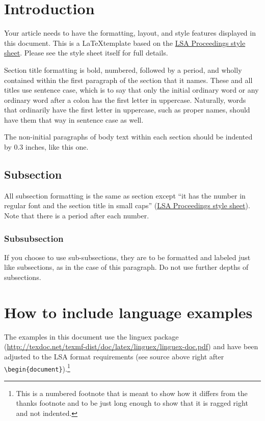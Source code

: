 \documentclass[12pt,letterpaper]{article}
\begin{document}
\section{Introduction} %
Your article needs to have the formatting, layout, and style features displayed in this document. This is a \LaTeX template based on the \href{https://drive.google.com/file/d/1r1YkBGcX7b7obNe0hLDrbJSSUTfNrFo1/view?usp=sharing}{LSA Proceedings style sheet}. Please see the style sheet itself for full details. 

Section title formatting is bold, numbered, followed by a period, and wholly contained within the first paragraph of the section that it names. These and all titles use sentence case, which is to say that only the initial ordinary word or any ordinary word after a colon has the first letter in uppercase. Naturally, words that ordinarily have the first letter in uppercase, such as proper names, should have them that way in sentence case as well.

The non-initial paragraphs of body text within each section should be indented by 0.3 inches, like this one.
 
 
 \subsection{Subsection} 
All subsection formatting is the same as section except ``it has the number in regular font and the section title in small caps'' (\href{http://journals.linguisticsociety.org/proceedings/index.php/PLSA/pages/view/instructions}{LSA Proceedings style sheet}). Note that there is a period after each number.

\subsubsection{Subsubsection}
If you choose to use sub-subsections, they are to be formatted and labeled just like subsections, as in the case of this paragraph. Do not use further depths of subsections.


\section{How to include language examples}

The examples in this document use the linguex package 	(\href{http://texdoc.net/texmf-dist/doc/latex/linguex/linguex-doc.pdf}{http://texdoc.net/texmf-dist/doc/latex/linguex/linguex-doc.pdf}) and have been adjusted to the LSA format requirements (see source above right after \verb=\begin{document}=).\footnote{This is a numbered footnote that is meant to show how it differs from the thanks footnote and to be just long enough to show that it is ragged right and not indented.}
\end{document}
